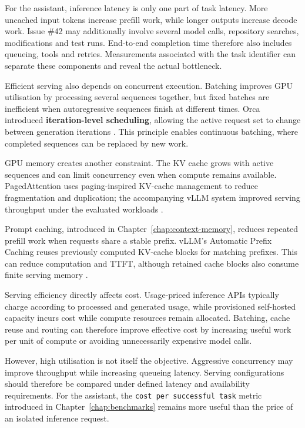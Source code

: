 For the assistant, inference latency is only one part of task latency. More uncached input tokens increase prefill work, while longer outputs increase decode work. Issue \#42 may additionally involve several model calls, repository searches, modifications and test runs. End-to-end completion time therefore also includes queueing, tools and retries. Measurements associated with the task identifier can separate these components and reveal the actual bottleneck.

Efficient serving also depends on concurrent execution. Batching improves GPU utilisation by processing several sequences together, but fixed batches are inefficient when autoregressive sequences finish at different times. Orca introduced \textbf{iteration-level scheduling}, allowing the active request set to change between generation iterations \parencite{yu2022orca}. This principle enables continuous batching, where completed sequences can be replaced by new work.

GPU memory creates another constraint. The KV cache grows with active sequences and can limit concurrency even when compute remains available. PagedAttention uses paging-inspired KV-cache management to reduce fragmentation and duplication; the accompanying vLLM system improved serving throughput under the evaluated workloads \parencite{kwon2023pagedattention}.

Prompt caching, introduced in Chapter~\ref{chap:context-memory}, reduces repeated prefill work when requests share a stable prefix. vLLM's Automatic Prefix Caching reuses previously computed KV-cache blocks for matching prefixes. This can reduce computation and TTFT, although retained cache blocks also consume finite serving memory \parencite{vllm-prefix-caching}.

Serving efficiency directly affects cost. Usage-priced inference APIs typically charge according to processed and generated usage, while provisioned self-hosted capacity incurs cost while compute resources remain allocated. Batching, cache reuse and routing can therefore improve effective cost by increasing useful work per unit of compute or avoiding unnecessarily expensive model calls.

However, high utilisation is not itself the objective. Aggressive concurrency may improve throughput while increasing queueing latency. Serving configurations should therefore be compared under defined latency and availability requirements. For the assistant, the \texttt{cost per successful task} metric introduced in Chapter~\ref{chap:benchmarks} remains more useful than the price of an isolated inference request.

